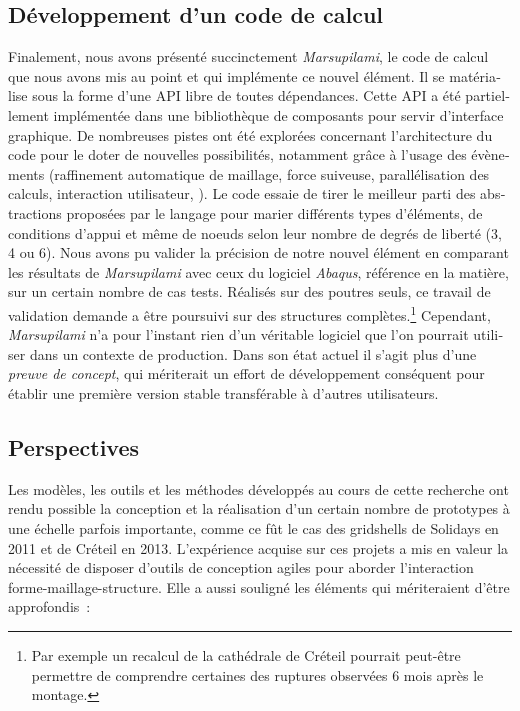 \begin{otherlanguage}{french}
\subsection*{Développement d'un code de calcul}

Finalement, nous avons présenté succinctement \emph{Marsupilami}, le code de calcul que nous avons mis au point et qui implémente ce nouvel élément. Il se matérialise sous la forme d'une API \Csharp{} libre de toutes dépendances. Cette API a été partiellement implémentée dans une bibliothèque de composants \grasshopper{} pour servir d'interface graphique. De nombreuses pistes ont été explorées concernant l'architecture du code pour le doter de nouvelles possibilités, notamment grâce à l'usage des évènements (raffinement automatique de maillage, force suiveuse, parallélisation des calculs, interaction utilisateur, \telp{}). Le code essaie de tirer le meilleur parti des abstractions proposées par le langage \Csharp{} pour marier différents types d'éléments, de conditions d'appui et même de noeuds selon leur nombre de degrés de liberté (3, 4 ou 6). Nous avons pu valider la précision de notre nouvel élément en comparant les résultats de \emph{Marsupilami} avec ceux du logiciel \emph{Abaqus}, référence en la matière, sur un certain nombre de cas tests. Réalisés sur des poutres seuls, ce travail de validation demande a être poursuivi sur des structures complètes.\footnote{Par exemple un recalcul de la cathédrale de Créteil pourrait peut-être permettre de comprendre certaines des ruptures observées 6 mois après le montage.} Cependant, \emph{Marsupilami} n'a pour l'instant rien d'un véritable logiciel que l'on pourrait utiliser dans un contexte de production. Dans son état actuel il s'agit plus d'une \emph{preuve de concept}, qui mériterait un effort de développement conséquent pour établir une première version stable transférable à d'autres utilisateurs.

\subsection*{Perspectives}
Les modèles, les outils et les méthodes développés au cours de cette recherche ont rendu possible la conception et la réalisation d'un certain nombre de prototypes à une échelle parfois importante, comme ce fût le cas des gridshells de Solidays en 2011 et de Créteil en 2013. L'expérience acquise sur ces projets a mis en valeur la nécessité de disposer d'outils de conception agiles pour aborder l'interaction forme-maillage-structure. Elle a aussi souligné les éléments qui mériteraient d'être approfondis~: 


\end{otherlanguage}
